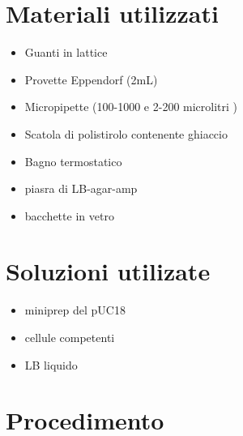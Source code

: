 \documentclass{article}
\begin{document}
 
\section{Materiali utilizzati}

\begin{itemize}
\item Guanti in lattice 
\item Provette Eppendorf (2mL)
\item Micropipette (100-1000  e 2-200 microlitri  )
\item Scatola di polistirolo contenente ghiaccio
\item Bagno termostatico
\item piasra di LB-agar-amp
\item bacchette in vetro 
\end{itemize}


\section{Soluzioni utilizate}

\begin{itemize}

\item miniprep del pUC18
\item cellule competenti 
\item LB liquido 

\end{itemize}



\section{Procedimento}
\end{document}
